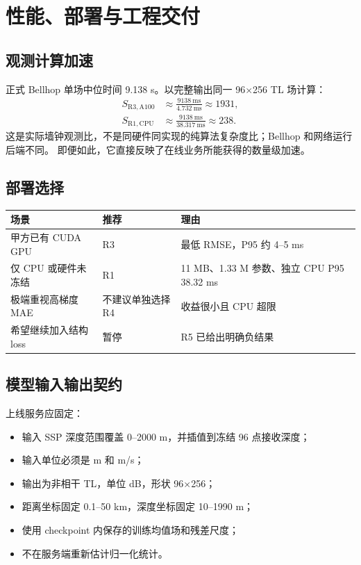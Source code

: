 \documentclass[UTF8,12pt,openany]{ctexrep}
\begin{document}
\chapter{性能、部署与工程交付}
\label{chap:deployment}

\section{观测计算加速}

正式 Bellhop 单场中位时间 9.138 s。以完整输出同一 96$\times$256 TL 场计算：
\begin{align}
  S_{\mathrm{R3,A100}} &\approx \frac{9138\ \mathrm{ms}}{4.732\ \mathrm{ms}}\approx 1931,\\
  S_{\mathrm{R1,CPU}} &\approx \frac{9138\ \mathrm{ms}}{38.317\ \mathrm{ms}}\approx 238.
\end{align}
这是实际墙钟观测比，不是同硬件同实现的纯算法复杂度比；Bellhop 和网络运行后端不同。
即便如此，它直接反映了在线业务所能获得的数量级加速。

\section{部署选择}

\noindent
\begin{tabularx}{\textwidth}{L{4.0cm}Y Y}
\toprule
场景 & 推荐 & 理由 \\
\midrule
甲方已有 CUDA GPU & R3 & 最低 RMSE，P95 约 4--5 ms \\
仅 CPU 或硬件未冻结 & R1 & 11 MB、1.33 M 参数、独立 CPU P95 38.32 ms \\
极端重视高梯度 MAE & 不建议单独选择 R4 & 收益很小且 CPU 超限 \\
希望继续加入结构 loss & 暂停 & R5 已给出明确负结果 \\
\bottomrule
\end{tabularx}

\section{模型输入输出契约}

上线服务应固定：
\begin{itemize}
  \item 输入 SSP 深度范围覆盖 0--2000 m，并插值到冻结 96 点接收深度；
  \item 输入单位必须是 m 和 m/s；
  \item 输出为非相干 TL，单位 dB，形状 96$\times$256；
  \item 距离坐标固定 0.1--50 km，深度坐标固定 10--1990 m；
  \item 使用 checkpoint 内保存的训练均值场和残差尺度；
  \item 不在服务端重新估计归一化统计。
\end{itemize}
\end{document}
